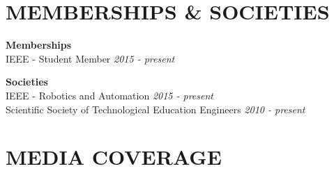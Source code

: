 \documentclass[11pt]{res} %
\begin{document}
\begin{resume}
\section{MEMBERSHIPS \& SOCIETIES}
\vspace{4pt} %
\small \textbf{Memberships}\\IEEE - Student Member \hfill{\it 2015 - present}

\small \textbf{Societies}\\IEEE - Robotics and Automation \hfill{\it 2015 - present}
\\Scientific Society of Technological Education Engineers \hfill{\it 2010 - present}

\vspace{0.1in} %
\section{MEDIA COVERAGE}


\end{resume}
\end{document}
